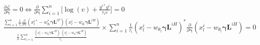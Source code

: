 \begin{align*}
    &\frac{\partial \mathcal{L}}{\partial \boldsymbol{\gamma}} = 0 \Longleftrightarrow
    \frac{\partial }{\partial\boldsymbol{\gamma}} \sum_{i=1}^n \Bigg[ \log\left( v \right) + \frac{y^{i*} y^i}{\tau_i v} \Bigg] = 0 \\
    & \frac{\sum_{i=1}^n \frac{1}{\tau_i} \frac{\partial}{\partial \boldsymbol{\gamma}}(x_{l}^{i*} - w_{\theta_{l}}^* \boldsymbol{\gamma} \mathbf{L}^{iT}) (x_{l}^i - w_{\theta_{l}} \boldsymbol{\gamma} \mathbf{L}^{iH})}{\frac{1}{n} \sum_{i=1}^n \frac{(x_{l}^i - w_{\theta_{l}} \boldsymbol{\gamma} \mathbf{L}^{iH})^*(x_{l}^i - w_{\theta_{l}} \boldsymbol{\gamma} \mathbf{L}^{iH})}{\tau_i}} \times \sum_{i=1}^n \frac{1}{\tau_i} (x_{l}^i - w_{\theta_{l}} \boldsymbol{\gamma} \mathbf{L}^{iH})^* \frac{\partial}{\partial \boldsymbol{\gamma}}(x_{l}^i - w_{\theta_{l}} \boldsymbol{\gamma} \mathbf{L}^{iH}) = 0\\

\end{align*}
